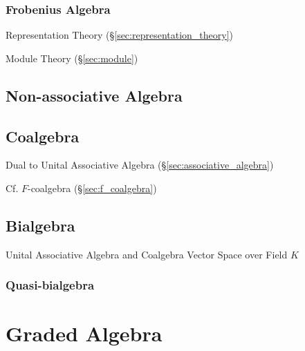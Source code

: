 \subsubsection{Frobenius Algebra}\label{sec:frobenius_algebra}

Representation Theory (\S\ref{sec:representation_theory})

Module Theory (\S\ref{sec:module})



\subsection{Non-associative Algebra}
\label{sec:nonassociative_algebra}

\subsection{Coalgebra}\label{sec:coalgebra}

Dual to Unital Associative Algebra (\S\ref{sec:associative_algebra})

Cf. $F$-coalgebra (\S\ref{sec:f_coalgebra})



\subsection{Bialgebra}\label{sec:bialgebra}

Unital Associative Algebra and Coalgebra Vector Space over Field $K$



\subsubsection{Quasi-bialgebra}\label{sec:quasi_bialgebra}



\section{Graded Algebra}\label{sec:graded_algebra}


